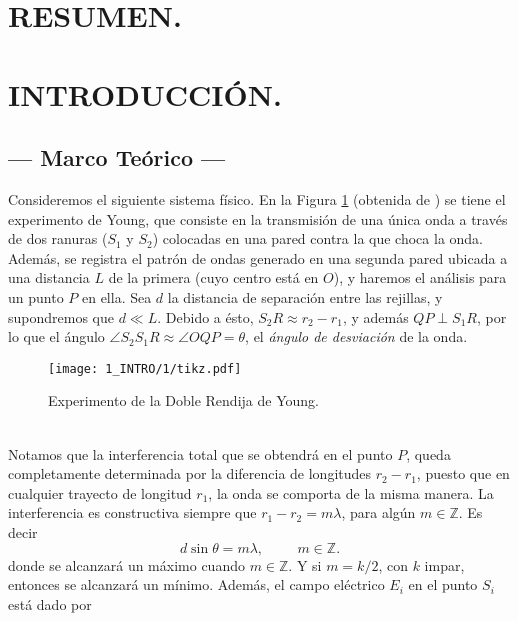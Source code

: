 \documentclass[12pt,a4paper]{article}
\begin{document}
\portada

\section{RESUMEN.} %

\section{INTRODUCCIÓN.} %

\subsection{--- Marco Teórico ---} %
\label{sub:marco_teorico}
Consideremos el siguiente sistema físico. En la Figura \ref{fig:constructiva} (obtenida de ) se tiene el experimento de Young, que consiste en la transmisión de una única onda a través de dos ranuras (\(S_1\) y \(S_2\)) colocadas en una pared contra la que choca la onda.
Además, se registra el patrón de ondas generado en una segunda pared ubicada a una distancia \(L\) de la primera (cuyo centro está en \(O\)), y haremos el análisis para un punto \(P\) en ella.
Sea \(d\) la distancia de separación entre las rejillas, y supondremos que \(d \ll L\).
Debido a ésto, \(S_2R \approx r_2-r_1\), y además \(QP \perp S_1R\), por lo que el ángulo \(\angle S_2S_1R \approx \angle OQP = \theta\), el \textit{ángulo de desviación} de la onda.
\begin{figure}[hbtp!]
	\centering
	\texttt{[image: 1\_INTRO/1/tikz.pdf]}
	\caption{Experimento de la Doble Rendija de Young.}
	\label{fig:constructiva}
\end{figure}\\
Notamos que la interferencia total que se obtendrá en el punto \(P\), queda completamente determinada por la diferencia de longitudes \(r_2-r_1\), puesto que en cualquier trayecto de longitud \(r_1\), la onda se comporta de la misma manera.
La interferencia es constructiva siempre que \(r_1-r_2 = m \lambda\), para algún \(m \in \mathds{Z}\). Es decir
\begin{equation}
	d \sin \theta = m \lambda , \hspace{1cm} m \in \mathds{Z} .
	\label{eq:young}
\end{equation}
donde se alcanzará un máximo cuando \(m \in \mathds{Z}\). Y si \(m=k/2\), con \(k\) impar, entonces se alcanzará un mínimo. Además, el campo eléctrico \(E_i\) en el punto \(S_i\) está dado por
\end{document}
